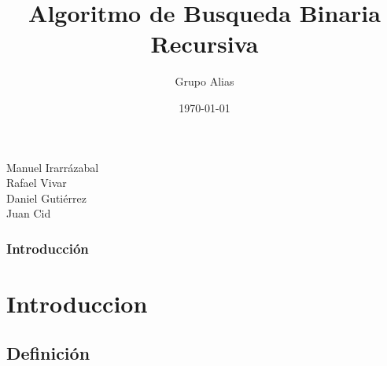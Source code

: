 \documentclass{beamer}
\title[Busqueda Binaria Recursiva]{Algoritmo de Busqueda Binaria Recursiva} %
\author{Grupo Alias} %
\institute[UTEM] %
{
Universidad Tecnológica Metropolitana\\  %
\medskip
\url{https://github.com/Lanceconan/AnalisisDeAlgoritmos} %
}
\date{\today} %
\begin{document}

\begin{frame}
	\titlepage %
\begin{center}
Manuel Irarrázabal \\  Rafael Vivar \\ Daniel Gutiérrez \\ Juan Cid
\end{center}
\end{frame}

\begin{frame}
	\frametitle{Introducción} %
	\tableofcontents %
\end{frame}


\section{Introduccion} %

	\subsection{Definición} %
\end{document}
